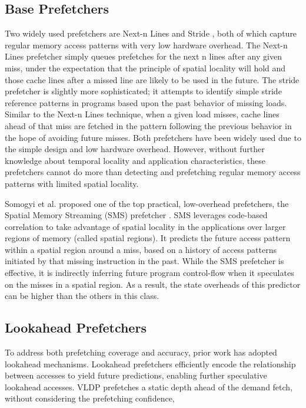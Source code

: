\subsection{Base Prefetchers}

Two widely used prefetchers are Next-n Lines \cite{nextnlines} and Stride \cite{stride}, both of which capture regular memory access patterns with very low hardware overhead. The Next-n Lines prefetcher simply queues prefetches for the next n lines after any given miss, under the expectation that the principle of spatial locality will hold and those cache lines after a missed line are likely to be used in the future. The stride prefetcher is slightly more sophisticated; it attempts to identify simple stride reference patterns in programs based upon the past behavior of missing loads. Similar to the Next-n Lines technique, when a given load misses, cache lines ahead of that miss are fetched in the pattern following the previous behavior in the hope of avoiding future misses. Both prefetchers have been widely used due to the simple design and low hardware overhead. However, without further knowledge about temporal locality and application characteristics, these prefetchers cannot do more than detecting and prefetching regular memory access patterns with limited spatial locality.

Somogyi et al. proposed one of the top practical, low-overhead prefetchers, the Spatial Memory Streaming (SMS) prefetcher \cite{sms}. SMS leverages code-based correlation to take advantage of spatial locality in the applications over larger regions of memory (called spatial regions). It predicts the future access pattern within a spatial region around a miss, based on a history of access patterns initiated by that missing instruction in the past. While the SMS prefetcher is effective, it is indirectly inferring future program control-flow when it speculates on the misses in a spatial region. As a result, the state overheads of this predictor can be higher than the others in this class.

\subsection{Lookahead Prefetchers}

To address both prefetching coverage and accuracy, prior work has adopted lookahead 
mechanisms. Lookahead prefetchers efficiently encode the relationship between accesses to yield future predictions, enabling further speculative lookahead accesses.
VLDP \cite {vldp} prefetches a static depth ahead of the demand fetch, without considering the prefetching confidence, 

